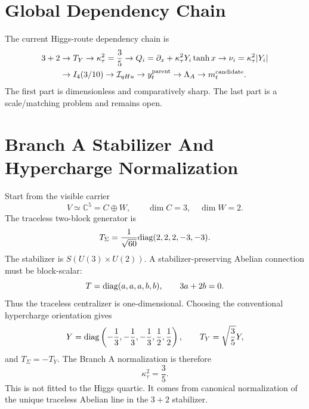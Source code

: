 \documentclass[11pt]{article}
\begin{document}
\section{Global Dependency Chain}
The current Higgs-route dependency chain is
\begin{equation}
\begin{aligned}
3+2
&\rightarrow
T_Y
\rightarrow
\kappa_\tau^2=\frac35
\rightarrow
Q_i=\partial_x+\kappa_\tau^2Y_i\tanh x
\rightarrow
\nu_i=\kappa_\tau^2|Y_i| \\
&\rightarrow
I_4(3/10)
\rightarrow
{\cal I}_{qHu}
\rightarrow
y_t^{\rm parent}
\rightarrow
\Lambda_A
\rightarrow
m_t^{\rm candidate}.
\end{aligned}
\end{equation}
The first part is dimensionless and comparatively sharp.  The last part is a
scale/matching problem and remains open.

\section{Branch A Stabilizer And Hypercharge Normalization}
Start from the visible carrier
\begin{equation}
V\simeq \mathbb{C}^5=C\oplus W,
\qquad
\dim C=3,
\quad
\dim W=2.
\end{equation}
The traceless two-block generator is
\begin{equation}
T_\Sigma=\frac1{\sqrt{60}}{\rm diag}(2,2,2,-3,-3).
\end{equation}
The stabilizer is $S(U(3)\times U(2))$.  A stabilizer-preserving Abelian
connection must be block-scalar:
\begin{equation}
T={\rm diag}(a,a,a,b,b),
\qquad
3a+2b=0.
\end{equation}
Thus the traceless centralizer is one-dimensional.  Choosing the conventional
hypercharge orientation gives
\begin{equation}
Y={\rm diag}\left(-\frac13,-\frac13,-\frac13,\frac12,\frac12\right),
\qquad
T_Y=\sqrt{\frac35}Y,
\end{equation}
and $T_\Sigma=-T_Y$.  The Branch A normalization is therefore
\begin{equation}
\kappa_\tau^2=\frac35.
\end{equation}
This is not fitted to the Higgs quartic.  It comes from canonical normalization
of the unique traceless Abelian line in the $3+2$ stabilizer.
\end{document}
